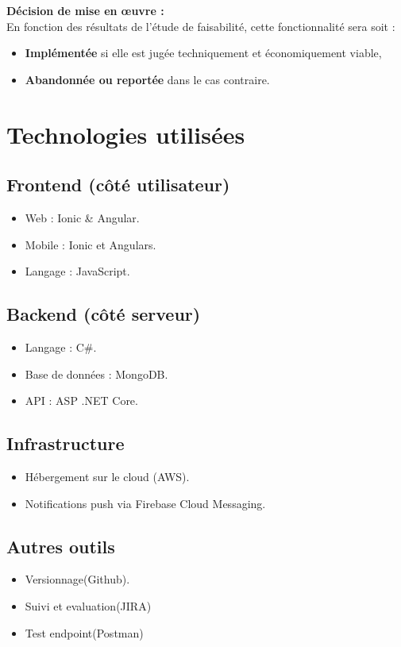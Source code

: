 \documentclass[a4paper,12pt]{article}
\begin{document}
\textbf{Décision de mise en œuvre :} \\
En fonction des résultats de l'étude de faisabilité, cette fonctionnalité sera soit :
\begin{itemize}
    \item \textbf{Implémentée} si elle est jugée techniquement et économiquement viable,
    \item \textbf{Abandonnée ou reportée} dans le cas contraire.
\end{itemize}

\section{Technologies utilisées}
\subsection{Frontend (côté utilisateur)}
\begin{itemize}
    \item Web : Ionic \&  Angular.
    \item Mobile : Ionic et Angulars.
  \item Langage : JavaScript.

\end{itemize}

\subsection{Backend (côté serveur)}
\begin{itemize}
    \item Langage : C\#.
    \item Base de données : MongoDB.
    \item API : ASP .NET Core.
\end{itemize}

\subsection{Infrastructure}
\begin{itemize}
    \item Hébergement sur le cloud (AWS).
    \item Notifications push via Firebase Cloud Messaging.
\end{itemize}
\subsection{Autres outils}
\begin{itemize}
  \item Versionnage(Github).
  \item Suivi et evaluation(JIRA)
\item Test endpoint(Postman)
\end{itemize}
\end{document}
